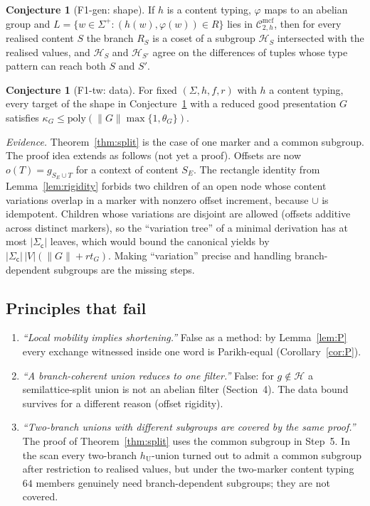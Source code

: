\documentclass[11pt]{article}
\theoremstyle{definition}
\newtheorem{conjecture}[theorem]{Conjecture}
\theoremstyle{remark}
\newcommand{\Cmcf}[2]{\mathcal{C}^{\mathrm{mcf}}_{#1,#2}}
\newcommand{\mk}{\mathsf c}
\begin{document}
\begin{conjecture}[F1-gen: shape]\label{conj:F1gen}
If $h$ is a content typing, $\varphi$ maps to an abelian group and
$L=\{w\in\Sigma^+:(h(w),\varphi(w))\in R\}$ lies in $\Cmcf{2}{h}$, then for
every realised content $S$ the branch $R_S$ is a coset of a subgroup
$\mathcal H_S$ intersected with the realised values, and $\mathcal H_S$ and
$\mathcal H_{S'}$ agree on the differences of tuples whose type pattern can
reach both $S$ and $S'$.
\end{conjecture}

\begin{conjecture}[F1-tw: data]\label{conj:F1tw}
For fixed $(\Sigma,h,f,r)$ with $h$ a content typing, every target of the
shape in Conjecture~\ref{conj:F1gen} with a reduced good presentation $G$
satisfies $\kappa_G\le\mathrm{poly}(\|G\|\max\{1,\theta_G\})$.
\end{conjecture}

\emph{Evidence.}  Theorem~\ref{thm:split} is the case of one marker and a
common subgroup.  The proof idea extends as follows (not yet a proof).
Offsets are now $o(T)=g_{S_E\cup T}$ for a context of content $S_E$.  The
rectangle identity from Lemma~\ref{lem:rigidity} forbids two children
of an open node whose content variations overlap in a marker with nonzero
offset increment, because $\cup$ is idempotent.  Children whose variations
are disjoint are allowed (offsets additive across distinct markers), so
the ``variation tree'' of a minimal derivation has at most
$|\Sigma_{\mk}|$ leaves, which would bound the canonical yields by
$|\Sigma_{\mk}|\,|V|(\|G\|+rt_G)$.  Making ``variation'' precise and
handling branch-dependent subgroups are the missing steps.

\subsection{Principles that fail}
\begin{enumerate}[label=(F\arabic*)]
\item \emph{``Local mobility implies shortening.''}  False as a method:
by Lemma~\ref{lem:P} every exchange witnessed inside one word is
Parikh-equal (Corollary~\ref{cor:P}).
\item \emph{``A branch-coherent union reduces to one filter.''}  False:
for $g\notin\mathcal H$ a semilattice-split union is not an abelian filter
(Section~4).  The data bound survives for a different reason (offset
rigidity).
\item \emph{``Two-branch unions with different subgroups are covered by
the same proof.''}  The proof of Theorem~\ref{thm:split} uses the common
subgroup in Step~5.  In the scan every two-branch $h_{\mathrm U}$-union
turned out to admit a common subgroup after restriction to realised
values, but under the two-marker content typing $64$ members genuinely
need branch-dependent subgroups; they are not covered.
\end{enumerate}
\end{document}
